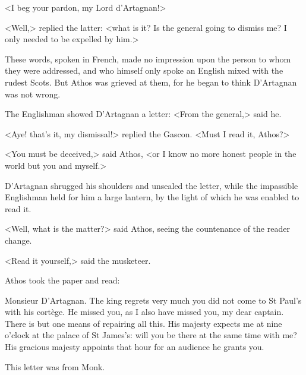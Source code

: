 <I beg your pardon, my Lord d'Artagnan!>

<Well,> replied the latter: <what is it? Is the general going to dismiss me? I only needed to be expelled by him.>

These words, spoken in French, made no impression upon the person to whom they were addressed, and who himself only spoke an English mixed with the rudest Scots. But Athos was grieved at them, for he began to think D'Artagnan was not wrong.

The Englishman showed D'Artagnan a letter: <From the general,> said he.

<Aye! that's it, my dismissal!> replied the Gascon. <Must I read it, Athos?>

<You must be deceived,> said Athos, <or I know no more honest people in the world but you and myself.>

D'Artagnan shrugged his shoulders and unsealed the letter, while the impassible Englishman held for him a large lantern, by the light of which he was enabled to read it.

<Well, what is the matter?> said Athos, seeing the countenance of the reader change.

<Read it yourself,> said the musketeer.

Athos took the paper and read:

\begin{mail}{}{Monsieur D'Artagnan.}
The king regrets very much you did not come to St Paul's with his cortège. He missed you, as I also have missed you, my dear captain. There is but one means of repairing all this. His majesty expects me at nine o'clock at the palace of St James's: will you be there at the same time with me? His gracious majesty appoints that hour for an audience he grants you.
\end{mail}

This letter was from Monk. 